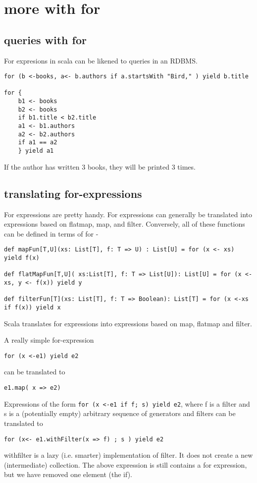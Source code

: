 \chapter{more with for}
\section{queries with for}

For expresions in scala can be likened to queries in an RDBMS.

\begin{lstlisting}
for (b <-books, a<- b.authors if a.startsWith "Bird," ) yield b.title

for { 
	b1 <- books
	b2 <- books
	if b1.title < b2.title
	a1 <- b1.authors
	a2 <- b2.authors
	if a1 == a2
	} yield a1
\end{lstlisting}

If the author has written 3 books, they will be printed 3 times.

\section{translating for-expressions}
For expressions are pretty handy. For expressions can generally be translated into expressions based on flatmap, map, and filter. Conversely, all of these functions can be defined in terms of for - 
\begin{lstlisting}
def mapFun[T,U](xs: List[T], f: T => U) : List[U] = for (x <- xs) yield f(x)

def flatMapFun[T,U]( xs:List[T], f: T => List[U]): List[U] = for (x <- xs, y <- f(x)) yield y

def filterFun[T](xs: List[T], f: T => Boolean): List[T] = for (x <-xs if f(x)) yield x

\end{lstlisting}

Scala translates for expressions into expressions based on map, flatmap and filter.

A really simple for-expression
\begin{lstlisting}
for (x <-e1) yield e2
\end{lstlisting}
can be translated to
\begin{lstlisting}
e1.map( x => e2)
\end{lstlisting}

Expressions of the form \lstinline|for (x <-e1 if f; s) yield e2|, where f is a filter and s is a (potentially empty) arbitrary sequence of generators and filters can be translated to 
\begin{lstlisting}
for (x<- e1.withFilter(x => f) ; s ) yield e2
\end{lstlisting}
withfilter is a lazy (i.e. smarter) implementation of filter. It does not create a new (intermediate) collection. The above expression is still contains a for expression, but we have removed one element (the if).

